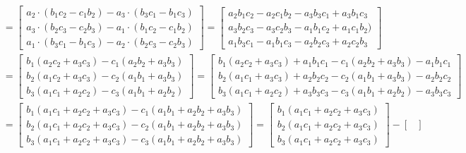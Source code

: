 \documentclass{article}
\begin{document}
\begin{enumerate}[(a)]
\begin{align*}
                &= \begin{bmatrix}
                    a_2\cdot(b_1c_2 - c_1b_2) - a_3\cdot(b_3c_1 - b_1c_3)\\
                    a_3\cdot(b_2c_3 - c_2b_3) - a_1\cdot(b_1c_2 - c_1b_2)\\
                    a_1\cdot(b_3c_1 - b_1c_3) - a_2\cdot(b_2c_3 - c_2b_3)
                \end{bmatrix} =
                \begin{bmatrix}
                    a_2b_1c_2-a_2c_1b_2 - a_3b_3c_1 +a_3b_1c_3\\
                    a_3b_2c_3 - a_3c_2b_3 -a_1b_1c_2 +a_1c_1b_2)\\
                    a_1b_3c_1 - a_1b_1c_3 - a_2b_2c_3 +a_2c_2b_3
                \end{bmatrix}\\
                &= \begin{bmatrix}
                    b_1(a_2c_2 + a_3c_3) -c_1(a_2b_2 + a_3b_3)\\
                    b_2(a_1c_2 + a_3c_3) -c_2(a_1b_1 + a_3b_3)\\
                    b_3(a_1c_1 + a_2c_2) -c_3(a_1b_1 + a_2b_2)
                \end{bmatrix} = \begin{bmatrix}
                    b_1(a_2c_2 + a_3c_3) + a_1b_1c_1-c_1(a_2b_2 + a_3b_3) - a_1b_1c_1\\
                    b_2(a_1c_1 + a_3c_3) +a_2b_2c_2 -c_2(a_1b_1 + a_3b_3) -a_2b_2c_2\\
                    b_3(a_1c_1 + a_2c_2) +a_3b_3c_3 -c_3(a_1b_1 + a_2b_2) -a_3b_3c_3
                \end{bmatrix}\\
                &= \begin{bmatrix}
                    b_1(a_1c_1+a_2c_2 + a_3c_3) -c_1(a_1b_1 + a_2b_2 + a_3b_3)\\
                    b_2(a_1c_1 +a_2c_2+ a_3c_3) -c_2(a_1b_1 +a_2b_2+a_3b_3)\\
                    b_3(a_1c_1 + a_2c_2+a_3c_3) -c_3(a_1b_1 + a_2b_2+a_3b_3)
                \end{bmatrix} = \begin{bmatrix}
                    b_1(a_1c_1+a_2c_2 + a_3c_3)\\
                    b_2(a_1c_1 +a_2c_2+ a_3c_3)\\
                    b_3(a_1c_1 + a_2c_2+a_3c_3)
                \end{bmatrix} - \begin{bmatrix}

\end{bmatrix}
\end{align*}
\end{enumerate}
\end{document}
